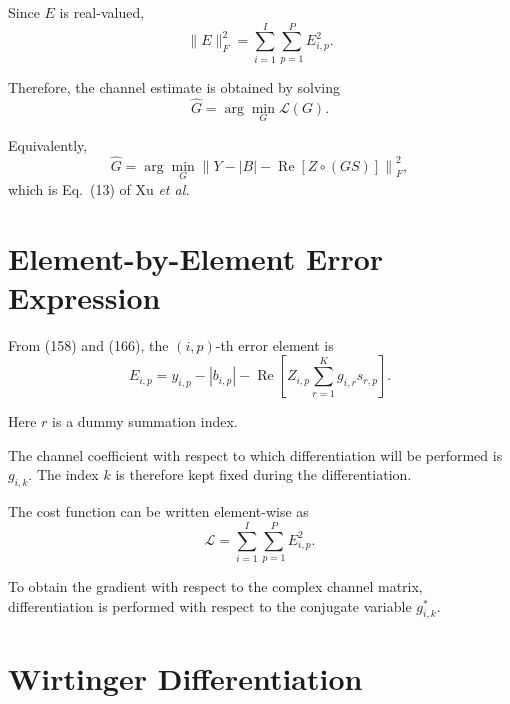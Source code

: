 \documentclass[12pt,a4paper]{article}
\begin{document}
Since $E$ is real-valued,
\begin{equation}
\|E\|_F^2
=
\sum_{i=1}^{I}
\sum_{p=1}^{P}
E_{i,p}^2.
\tag{171}
\end{equation}

Therefore, the channel estimate is obtained by solving
\begin{equation}
\boxed{
\widehat G
=
\arg\min_{G}
\mathcal L(G)
}.
\tag{172}
\end{equation}

Equivalently,
\begin{equation}
\boxed{
\widehat G
=
\arg\min_{G}
\left\|
Y-|B|-\operatorname{Re}[Z\circ(GS)]
\right\|_F^2
},
\tag{173}
\end{equation}
which is Eq.~(13) of Xu \emph{et al.}

\section{Element-by-Element Error Expression}

From (158) and (166), the $(i,p)$-th error element is
\begin{equation}
E_{i,p}
=
y_{i,p}
-
|b_{i,p}|
-
\operatorname{Re}
\left[
Z_{i,p}
\sum_{r=1}^{K}
g_{i,r}s_{r,p}
\right].
\tag{174}
\end{equation}

Here $r$ is a dummy summation index.

The channel coefficient with respect to which differentiation will
be performed is $g_{i,k}$. The index $k$ is therefore kept fixed
during the differentiation.

The cost function can be written element-wise as
\begin{equation}
\boxed{
\mathcal L
=
\sum_{i=1}^{I}
\sum_{p=1}^{P}
E_{i,p}^2
}.
\tag{175}
\end{equation}

To obtain the gradient with respect to the complex channel matrix,
differentiation is performed with respect to the conjugate variable
$g_{i,k}^*$.

\section{Wirtinger Differentiation}
\end{document}

